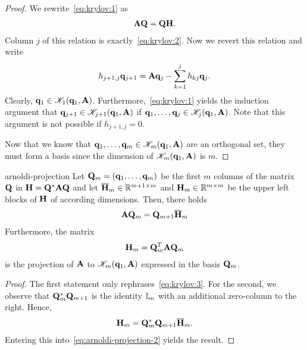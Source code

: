 \begin{proof}
  We rewrite~\eqref{eq:krylov:1} as
  \begin{gather}
    \mathbf A\mathbf Q = \mathbf Q\mathbf H.
  \end{gather}
  Column $j$ of this relation is exactly~\eqref{eq:krylov:2}. Now we
  revert this relation and write
  \begin{gather}
    \label{eq:krylov:3}
    h_{j+1,j} \mathbf q_{j+1} = \mathbf A\mathbf q_j - \sum_{k=1}^j h_{kj} \mathbf q_j.
  \end{gather}
  Clearly, $\mathbf q_1\in\mathscr K_1(\mathbf q_1,\mathbf A)$.
  Furthermore,~\eqref{eq:krylov:1} yields the induction argument that
  $\mathbf q_{j+1}\in \mathscr K_{j+1}(\mathbf q_1,\mathbf A)$ if
  $\mathbf q_1,\dots,\mathbf q_j\in \mathscr K_j(\mathbf q_1,\mathbf A)$. Note that this
  argument is not possible if $h_{j+1,j}=0$.

  Now that we know that $\mathbf q_1,\dots,\mathbf q_m\in\mathscr K_{m}(\mathbf q_1,\mathbf A)$
  are an orthogonal set, they must form a basis since the dimension of
  $\mathscr K_{m}(\mathbf q_1,\mathbf A)$ is $m$.
\end{proof}

\begin{Theorem}{arnoldi-projection}
  Let $\mathbf Q_m = (\mathbf q_1,\dots,\mathbf q_m)$ be the first $m$ columns of the
  matrix $\mathbf Q$ in $\mathbf H = \mathbf Q^*\mathbf A\mathbf Q$ and let
  $\overline{\mathbf H}_m\in\mathbb R^{m+1\times m}$ and
  $\mathbf H_m\in\mathbb R^{m\times m}$ be the upper left blocks of $\mathbf H$ of
  according dimensions. Then, there holds
  \begin{gather}
    \label{eq:arnoldi-projection-2}
    \mathbf A\mathbf Q_m
    = \mathbf Q_{m+1}\overline{\mathbf H}_m
  \end{gather}
  Furthermore, the matrix
  \begin{gather}
    \label{eq:arnoldi-projection-3}
    \mathbf H_m = \mathbf Q_m^T\mathbf A\mathbf Q_m
  \end{gather}
  is the projection of $\mathbf A$ to $\mathscr K_m(\mathbf q_1,\mathbf A)$ expressed
  in the basis $\mathbf Q_m$.
\end{Theorem}

\begin{proof}
  The first statement only rephrases~\eqref{eq:krylov:3}. For the
  second, we observe that $\mathbf Q_m^*\mathbf Q_{m+1}$ is the identity
  $\mathbb I_m$ with an additional zero-column to the right. Hence,
  \begin{gather}
    \mathbf H_m = \mathbf Q_m^*\mathbf Q_{m+1}\overline{\mathbf H}_{m}.
  \end{gather}
  Entering this into~\eqref{eq:arnoldi-projection-2} yields the result.
\end{proof}

